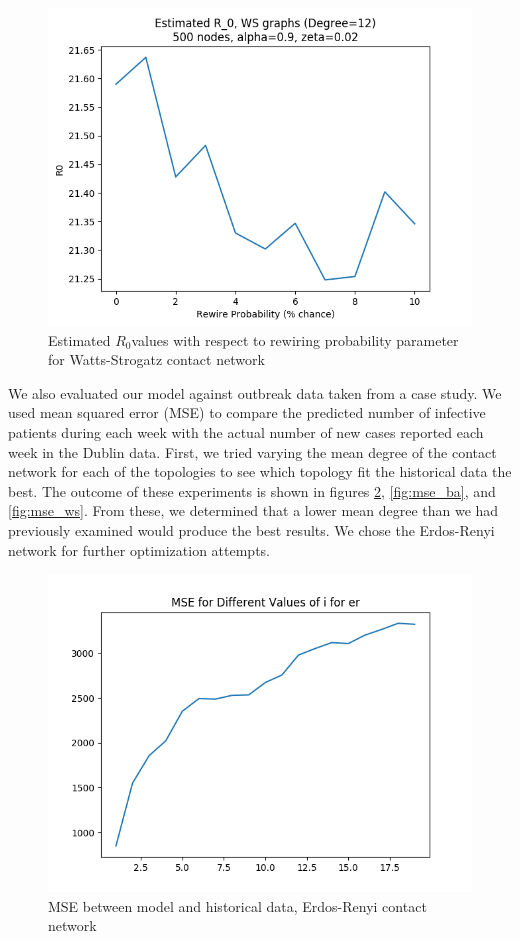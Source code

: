 \documentclass[conference]{IEEEtran}
\newcommand{\ro}{$R_0$}
\begin{document}
\begin{figure}[t]
    \centering
    \includegraphics[scale=0.5]{images/est_r0_ws_rewire.png}
    \caption{Estimated \ro values with respect to rewiring probability parameter for Watts-Strogatz contact network}
    \label{fig:r0_ws_beta}
\end{figure}

We also evaluated our model against outbreak data taken from a case study.\cite{Mcbrein2003} We used mean squared error (MSE) to compare the predicted number of infective patients during each week with the actual number of new cases reported each week in the Dublin data. First, we tried varying the mean degree of the contact network for each of the topologies to see which topology fit the historical data the best. The outcome of these experiments is shown in figures \ref{fig:mse_er}, \ref{fig:mse_ba}, and \ref{fig:mse_ws}. From these, we determined that a lower mean degree than we had previously examined would produce the best results. We chose the Erdos-Renyi network for further optimization attempts.

\begin{figure}[t]
    \centering
    \includegraphics[scale=0.5]{images/mse_er.png}
    \caption{MSE between model and historical data, Erdos-Renyi contact network}
    \label{fig:mse_er}
\end{figure}
\end{document}
